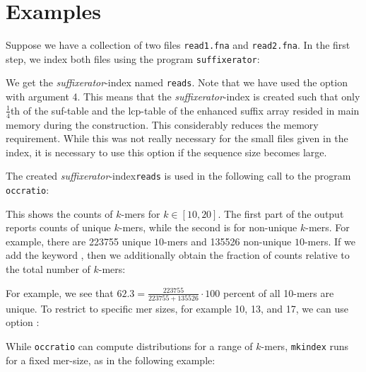 \documentclass[12pt]{article}
\newcommand{\Programname}[1]{\texttt{\small #1}}
\newcommand{\TYmkindex}[0]{\Programname{mkindex}\xspace}
\newcommand{\TYoccratio}[0]{\Programname{occratio}\xspace}
\newcommand{\SFX}[0]{\Programname{suffixerator}\xspace}
\newcommand{\SFXidx}[0]{\textit{suffixerator}-index\xspace}
\begin{document}
\section{Examples}\label{Examples}

Suppose we have a collection of two files \texttt{read1.fna} and
\texttt{read2.fna}. In the first step, we index 
both files using the program \SFX:


We get the \SFXidx named \texttt{reads}. Note that we have
used the option  with argument 4. This means that 
the \SFXidx is created such that only $\frac{1}{4}$th of the
\textsf{suf}-table and the \textsf{lcp}-table of the enhanced suffix array
resided in main memory during the construction. This considerably reduces 
the memory requirement.
While this was not really necessary for the small files given in the
index, it is necessary to use this option if the sequence size becomes large.

The created \SFXidx \texttt{reads} 
is used in the following call to the program \TYoccratio:


This shows the counts of $k$-mers for $k\in[10,20]$. The first part of the
output reports counts of unique $k$-mers, while the second is for
non-unique $k$-mers. For example, there are 223755 unique $10$-mers 
and 135526 non-unique $10$-mers. If we add the keyword 
, then we additionally obtain the fraction
of counts relative to the total number of $k$-mers:


For example, we see that $62.3=\frac{223755}{223755+135526}\cdot 100$
percent of all 10-mers are unique. To restrict to specific mer sizes, for
example 10, 13, and 17, we can use option :


While \TYoccratio can compute distributions for a range of 
$k$-mers, \TYmkindex runs for a fixed mer-size, as in the following example:

\end{document}
